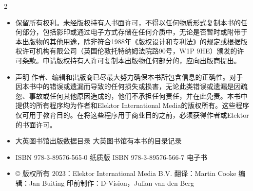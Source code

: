 \documentclass{ctexbook}
\begin{document}
\begin{paracol}{2}
\switchcolumn

\begin{itemize}
    \item 保留所有权利。未经版权持有人书面许可，不得以任何物质形式复制本书的任何部分，包括影印或通过电子方式存储在任何介质中，无论是否暂时或附带于本出版物的其他用途，除非符合1988年《版权设计和专利法》的规定或根据版权许可机构有限公司（英国伦敦托特纳姆法院路90号，W1P 9HE）颁发的许可条款。申请版权持有人许可复制本出版物任何部分的，应向出版商提出。
    \item 声明
    作者、编辑和出版商已尽最大努力确保本书所包含信息的正确性。对于因本书中的错误或遗漏而导致的任何损失或损害，无论此类错误或遗漏是因疏忽、事故或任何其他原因造成的，他们不承担任何责任，并在此免责。本书中提供的所有程序均为作者和Elektor International Media的版权所有。这些程序仅可用于教育目的。在将这些程序用于商业目的之前，必须获得作者或Elektor的书面许可。
    \item 大英图书馆出版数据目录
    大英图书馆有本书的目录记录
    \item ISBN 978-3-89576-565-0 纸质版
    ISBN 978-3-89576-566-7 电子书
    \item © 版权所有 2023：Elektor International Media B.V.
    翻译：Martin Cooke
    编辑：Jan Buiting
    印前制作：D-Vision，Julian van den Berg
\end{itemize}

\end{paracol}
\end{document}
